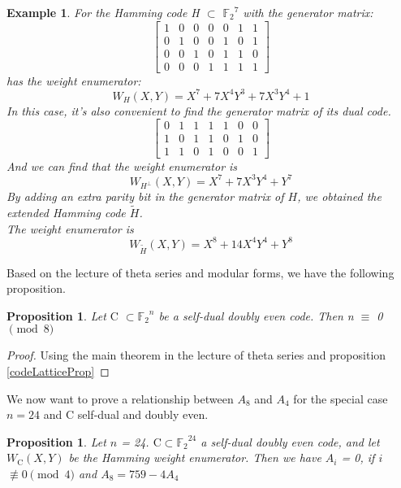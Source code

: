 \documentclass{article}
\newtheorem{example}[theorem]{Example}
\newtheorem{prop}[theorem]{Proposition}
\numberwithin{equation}{theorem}
\numberwithin{figure}{theorem}
\newcommand{\Ftwo}{\ensuremath{\mathbb{F}_2}}
\newcommand{\simpleCodes}{\ensuremath{\mathrm{C}}}
\newcommand{\buildVertical}[1]{\ensuremath{#1^{\bot}}}
\newcommand{\weightEnumerator}[3]{\ensuremath{W_{#1}(#2,#3)}}
\begin{document}
\begin{example}\label{hammingExample}
	For the Hamming code H $\subset$ $\Ftwo^7$ with the generator matrix:
	\[
	\left[
		\begin{matrix}
			1 &0 &0 &0 &0 &1 &1 \\
			0 &1 &0 &0 &1 &0 &1 \\
			0 &0 &1 &0 &1 &1 &0 \\
			0 &0 &0 &1 &1 &1 &1
		\end{matrix}
	\right]
	\]
	has the weight enumerator:
	\[
		\weightEnumerator{H}{X}{Y} = X^7 + 7X^4Y^3 + 7X^3Y^4 + 1
	\]
	In this case, it's also convenient to find the generator matrix of its dual code.
	\[
		\left[
			\begin{matrix}
				0 & 1 & 1 & 1 & 1 & 0 & 0 \\
				1 & 0 & 1 & 1 & 0 & 1 & 0 \\
				1 & 1 & 0 & 1 & 0 & 0 & 1
			\end{matrix}
		\right]
	\]
	And we can find that the weight enumerator is 
	\[
		\weightEnumerator{\buildVertical{H}}{X}{Y} = X^7 + 7X^3Y^4 + Y^7
 	\]
 	By adding an extra parity bit in the generator matrix of $H$, we obtained the extended Hamming code $\widetilde{H}$.\\
 	The weight enumerator is
 	\[
 		\weightEnumerator{\widetilde{H}}{X}{Y} = X^8 + 14X^4Y^4 + Y^8
 	\]
\end{example}
Based on the lecture of theta series and modular forms, we have the following proposition.
\begin{prop}
Let {\simpleCodes} $\subset \Ftwo^n$ be a self-dual doubly even code. Then n $\equiv$ 0 $\pmod 8$ 
\end{prop}
\begin{proof}
Using the main theorem in the lecture of theta series and proposition \ref{codeLatticeProp}
\end{proof}
We now want to prove a relationship between $A_8$ and $A_4$ for the special case $n = 24$ and $\simpleCodes$ self-dual and doubly even.
\begin{prop}\label{A8A4}
Let $n$ = 24. $\simpleCodes \subset \Ftwo^{24}$ a self-dual doubly even code, and let {\weightEnumerator{\simpleCodes}{X}{Y}} be the Hamming weight enumerator. Then we have $A_i$ = 0, if $i$ $\not\equiv 0 \pmod 4$ and $A_8 = 759 - 4 A_4$
\end{prop}
\end{document}
